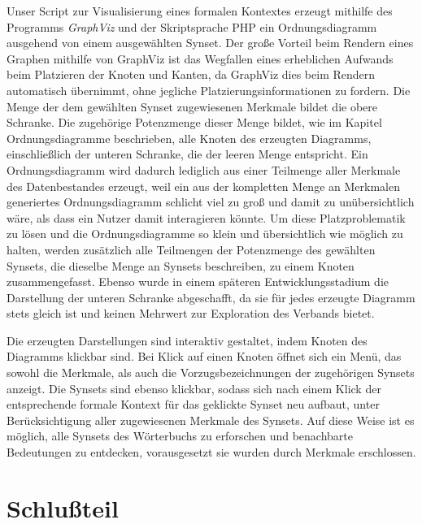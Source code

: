 \documentclass[pagesize,paper=A4,DIV=calc,fontsize=12pt,draft=false]{scrreprt}
\begin{document}
Unser Script zur Visualisierung eines formalen Kontextes erzeugt mithilfe des Programms \emph{GraphViz} und der Skriptsprache PHP ein Ordnungsdiagramm ausgehend von einem ausgewählten Synset. 
Der große Vorteil beim Rendern eines Graphen mithilfe von GraphViz ist das Wegfallen eines erheblichen Aufwands beim Platzieren der Knoten und Kanten, da GraphViz dies beim Rendern automatisch übernimmt, ohne jegliche Platzierungsinformationen zu fordern. 
Die Menge der dem gewählten Synset zugewiesenen Merkmale bildet die obere Schranke. 
Die zugehörige Potenzmenge dieser Menge bildet, wie im Kapitel Ordnungsdiagramme beschrieben, alle Knoten des erzeugten Diagramms, einschließlich der unteren Schranke, die der leeren Menge entspricht. 
Ein Ordnungsdiagramm wird dadurch lediglich aus einer Teilmenge aller Merkmale des Datenbestandes erzeugt, weil ein aus der kompletten Menge an Merkmalen generiertes Ordnungsdiagramm schlicht viel zu groß und damit zu unübersichtlich wäre, als dass ein Nutzer damit interagieren könnte. 
Um diese Platzproblematik zu lösen und die Ordnungsdiagramme so klein und übersichtlich wie möglich zu halten, werden zusätzlich alle Teilmengen der Potenzmenge des gewählten Synsets, die dieselbe Menge an Synsets beschreiben, zu einem Knoten zusammengefasst. 
Ebenso wurde in einem späteren Entwicklungsstadium die Darstellung der unteren Schranke abgeschafft, da sie für jedes erzeugte Diagramm stets gleich ist und keinen Mehrwert zur Exploration des Verbands bietet.

Die erzeugten Darstellungen sind interaktiv gestaltet, indem Knoten des Diagramms klickbar sind. 
Bei Klick auf einen Knoten öffnet sich ein Menü, das sowohl die Merkmale, als auch die Vorzugsbezeichnungen der zugehörigen Synsets anzeigt. 
Die Synsets sind ebenso klickbar, sodass sich nach einem Klick der entsprechende formale Kontext für das geklickte Synset neu aufbaut, unter Berücksichtigung aller zugewiesenen Merkmale des Synsets. 
Auf diese Weise ist es möglich, alle Synsets des Wörterbuchs zu erforschen und benachbarte Bedeutungen zu entdecken, vorausgesetzt sie wurden durch Merkmale erschlossen. 

\chapter{Schlußteil}
\end{document}
